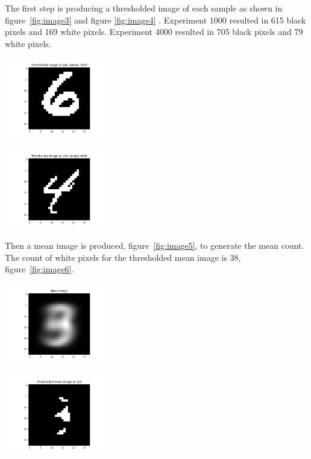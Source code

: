 The first step is producing a thresholded image of each sample as shown in figure~\ref{fig:image3} and figure \ref{fig:image4} . Experiment 1000 resulted in 615 black pixels and 169 white pixels. Experiment 4000 resulted in 705 black pixels and 79 white pixels.

\begin{center}
\includegraphics[width=0.35\textwidth]{image3.png}
\end{center}

\begin{center}
\includegraphics[width=0.35\textwidth]{image4.png}
\end{center}

Then a mean image is produced, figure~\ref{fig:image5}, to generate the mean count.
The count of white pixels for the thresholded mean image is 38, figure~\ref{fig:image6}.

\begin{center}
\includegraphics[width=0.35\textwidth]{image5.png}
\end{center}

\begin{center}
\includegraphics[width=0.35\textwidth]{image6.png}
\end{center}

